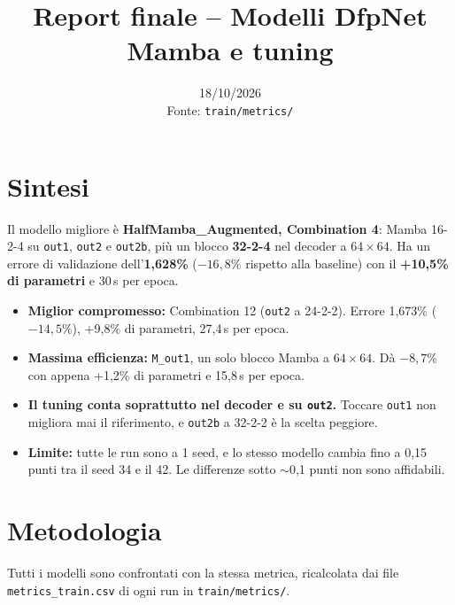 \documentclass[11pt,a4paper]{article}
\title{Report finale -- Modelli DfpNet Mamba e tuning}
\author{}
\date{18/10/2026 \\ \small Fonte: \texttt{train/metrics/}}
\newcommand{\cfg}[1]{\texttt{#1}}
\begin{document}
\maketitle

\section*{Sintesi}

Il modello migliore è \textbf{HalfMamba\_Augmented, Combination 4}: Mamba 16-2-4 su \cfg{out1}, \cfg{out2} e \cfg{out2b}, più un blocco \textbf{32-2-4} nel decoder a $64\times64$. Ha un errore di validazione dell'\textbf{1,628\%} ($-16{,}8\%$ rispetto alla baseline) con il \textbf{+10,5\% di parametri} e 30\,s per epoca.

\begin{itemize}
  \item \textbf{Miglior compromesso:} Combination 12 (\cfg{out2} a 24-2-2). Errore 1,673\% ($-14{,}5\%$), +9,8\% di parametri, 27,4\,s per epoca.
  \item \textbf{Massima efficienza:} \cfg{M\_out1}, un solo blocco Mamba a $64\times64$. Dà $-8{,}7\%$ con appena +1,2\% di parametri e 15,8\,s per epoca.
  \item \textbf{Il tuning conta soprattutto nel decoder e su \cfg{out2}.} Toccare \cfg{out1} non migliora mai il riferimento, e \cfg{out2b} a 32-2-2 è la scelta peggiore.
  \item \textbf{Limite:} tutte le run sono a 1 seed, e lo stesso modello cambia fino a 0,15 punti tra il seed 34 e il 42. Le differenze sotto $\sim$0,1 punti non sono affidabili.
\end{itemize}

\section{Metodologia}

Tutti i modelli sono confrontati con la stessa metrica, ricalcolata dai file \cfg{metrics\_train.csv} di ogni run in \cfg{train/metrics/}.
\end{document}
